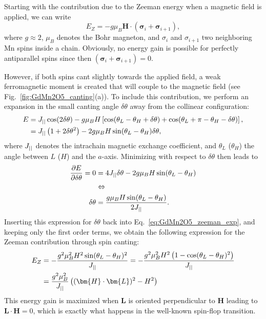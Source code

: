 Starting with the contribution due to the Zeeman energy when a magnetic field is applied, we can write 
\begin{equation}
	E_Z = -g \mu_B \bm{H} \cdot (\pmb{\sigma}_i + \pmb{\sigma}_{i+1})\nonumber,
\end{equation}
where $g \approx 2$, $\mu_B$ denotes the Bohr magneton, and $\sigma_i$ and $\sigma_{i+1}$ two neighboring Mn spins inside a chain. 
Obviously, no energy gain is possible for perfectly antiparallel spins since then $(\pmb{\sigma}_i + \pmb{\sigma}_{i+1})=0$.

However, if both spins cant slightly towards the applied field, a weak ferromagnetic moment is created that will couple to the magnetic field (see Fig.~\ref{fig:GdMn2O5_canting}(a)).
To include this contribution, we perform an expansion in the small canting angle $\delta \theta$ away from the collinear configuration:
\begin{align}
	E &= J_{||} \cos(2\delta \theta) - g \mu_B H \left[\cos(\theta_L - \theta_H + \delta \theta) + \cos(\theta_L + \pi - \theta_H - \delta \theta)\right],\nonumber\\
	&= J_{||} \left( 1+2\delta\theta^2 \right) - 2 g \mu_B H \sin(\theta_L - \theta_H)\delta\theta \label{eq:GdMn2O5_zeeman_exp},
\end{align}
where $J_{||}$ denotes the intrachain magnetic exchange coefficient, and $\theta_L$ ($\theta_H$) the angle between $L$ ($H$) and the $a$-axis.
Minimizing with respect to $\delta \theta$ then leads to
\begin{align}
	\frac{\partial E}{\partial \delta \theta} = 0 &= 4 J_{||} \delta \theta - 2 g \mu_B H \sin(\theta_L - \theta_H) \nonumber\\
	&\Leftrightarrow \nonumber\\
	\delta \theta &= \frac{g\mu_B H \sin(\theta_L - \theta_H)}{2 J_{||}}.\nonumber
\end{align}
Inserting this expression for $\delta \theta$ back into Eq.~\eqref{eq:GdMn2O5_zeeman_exp}, and keeping only the first order terms, we obtain the following expression for the Zeeman contribution through spin canting:
\begin{align}
	\label{eq:GdMn2O5_Zeeman}
	E_Z &= -\frac{g^2\mu_B^2 H^2 \sin(\theta_L - \theta_H)^2}{\Jpar} = -\frac{g^2\mu_B^2 H^2 \left(1 - \cos(\theta_L - \theta_H)^2\right)}{\Jpar}\\
	&=\frac{g^2\mu_B^2}{\Jpar}\left((\bm{H}\cdot\bm{L})^2 - H^2\right)\nonumber
\end{align}
This energy gain is maximized when $\bm{L}$ is oriented perpendicular to $\bm{H}$ leading to $\bm L \cdot \bm H = 0$, which is exactly what happens in the well-known spin-flop transition.
